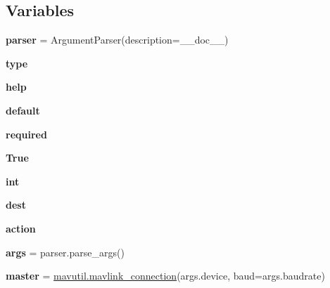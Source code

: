 \subsection*{Variables}
\begin{DoxyCompactItemize}
\item 
\mbox{\label{namespacepymavlink_1_1examples_1_1apmsetrate_a9220578b8e15a0a37d32b26f3da427c4}} 
{\bfseries parser} = Argument\+Parser(description=\+\_\+\+\_\+doc\+\_\+\+\_\+)
\item 
\mbox{\label{namespacepymavlink_1_1examples_1_1apmsetrate_a6ddec302ac765bf4507deaeac82a9742}} 
{\bfseries type}
\item 
\mbox{\label{namespacepymavlink_1_1examples_1_1apmsetrate_ae8a6327ada7faeb472130ecdce104581}} 
{\bfseries help}
\item 
\mbox{\label{namespacepymavlink_1_1examples_1_1apmsetrate_a2db28a2885d7359979121c13d7bd7c2e}} 
{\bfseries default}
\item 
\mbox{\label{namespacepymavlink_1_1examples_1_1apmsetrate_a683c2a204848ddfee318149314790dfd}} 
{\bfseries required}
\item 
\mbox{\label{namespacepymavlink_1_1examples_1_1apmsetrate_aa54a6631d98e57dda89237a6b61feca3}} 
{\bfseries True}
\item 
\mbox{\label{namespacepymavlink_1_1examples_1_1apmsetrate_aeb3bfdbda45b3c1181d5de2f09faef7d}} 
{\bfseries int}
\item 
\mbox{\label{namespacepymavlink_1_1examples_1_1apmsetrate_a0610d1cb2ff9cf82c33f096070ddf7ac}} 
{\bfseries dest}
\item 
\mbox{\label{namespacepymavlink_1_1examples_1_1apmsetrate_a0fc32ac97d6ceb898143319f6021332c}} 
{\bfseries action}
\item 
\mbox{\label{namespacepymavlink_1_1examples_1_1apmsetrate_a68b17ae8dfbe9bc451937dccb22205e4}} 
{\bfseries args} = parser.\+parse\+\_\+args()
\item 
\mbox{\label{namespacepymavlink_1_1examples_1_1apmsetrate_a04860ab120e9f285b98b4210cce0cb25}} 
{\bfseries master} = \hyperlink{namespacepymavlink_1_1mavutil_a021b0a1b1d488c0800662acaef819852}{mavutil.\+mavlink\+\_\+connection}(args.\+device, baud=args.\+baudrate)
\end{DoxyCompactItemize}


